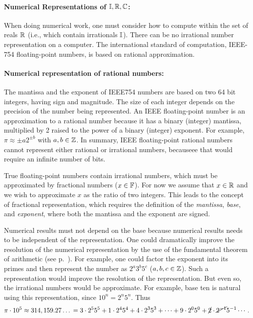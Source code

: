 \documentclass{ximera}
\begin{document}
\paragraph{Numerical Representations of $\mathbb{I}, \mathbb{R}, \mathbb{C}$:}
When doing numerical work, one must consider how to compute within the set of reals $\mathbb{R}$ (i.e., which contain irrationals $\mathbb{I}$). 
There can be no irrational number representation on a computer.
The international standard of computation, IEEE-754 floating-point numbers,%
is based on rational approximation. 

\paragraph{Numerical representation of rational numbers:}
The mantissa and the exponent of IEEE754 numbers are based on two 64 bit integers, having sign and magnitude.
The size of each integer depends on the precision of the number being represented. 
An IEEE floating-point number is an approximation to a rational number because it has a binary (integer) mantissa, multiplied by 2 raised to
the power of a binary (integer) exponent.
{\magenta For example, $\pi \approx \pm a 2^{\pm b}$ with $a,b\in\mathbb{Z}$.
In summary, IEEE floating-point rational numbers cannot represent either rational or irrational
numbers, becauseee that would require an infinite number of bits.
 }

True floating-point numbers contain irrational numbers, which must be approximated by fractional numbers ($x\in\mathbb{F}$). 
For now we assume that $\boldmath{x}\in\mathbb{R}$ and we wish to approximate $x$ as the ratio of two integers.
This leads to the concept of fractional representation, which requires the definition of the
\emph{mantissa}, \emph{base}, and \emph{exponent}, where both the mantissa and the exponent are signed.

Numerical results must not depend on the base because numerical results needs to be independent of the representation.
One could dramatically improve the resolution of the numerical representation by the use of the fundamental theorem of arithmetic (see p.~\pageref{FT:AR}). 
For example, one could factor the exponent into its
primes and then represent the number as $2^a 3^b 5^c$ ($a, b, c \in \mathbb{Z}$).
Such a representation would improve the resolution of the representation. But even so, the irrational
numbers would be approximate.
For example, base ten is natural using this representation, since $10^n = 2^n 5^n$.%
Thus
\[
\pi \cdot 10^5 \approx 314, 159.27\ldots\, = 3\cdot 2^5 5^5 + 1\cdot 2^4 5^4 + 4\cdot2^3 5^3 + \cdots +
9\cdot 2^0 5^0 + \cancel{2}\cdot \cancel{2^{-1}} 5^{-1} \cdots.
\]
\end{document}
